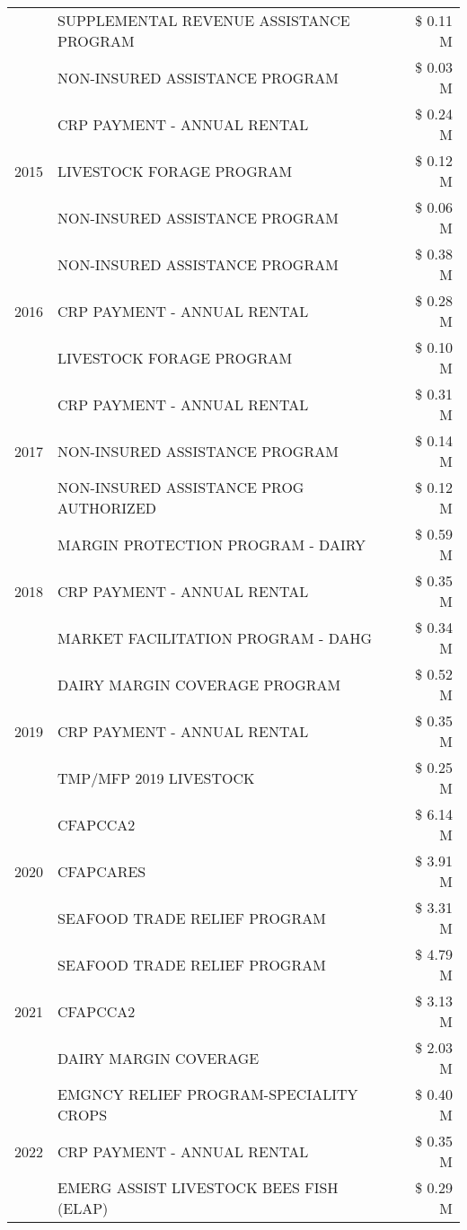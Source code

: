 \begin{tabular}{llr}
 & SUPPLEMENTAL REVENUE ASSISTANCE PROGRAM & \$ 0.11 M \\
 & NON-INSURED ASSISTANCE PROGRAM & \$ 0.03 M \\
\cline{1-3}
\multirow[t]{3}{*}{2015} & CRP PAYMENT - ANNUAL RENTAL & \$ 0.24 M \\
 & LIVESTOCK FORAGE PROGRAM & \$ 0.12 M \\
 & NON-INSURED ASSISTANCE PROGRAM & \$ 0.06 M \\
\cline{1-3}
\multirow[t]{3}{*}{2016} & NON-INSURED ASSISTANCE PROGRAM & \$ 0.38 M \\
 & CRP PAYMENT - ANNUAL RENTAL & \$ 0.28 M \\
 & LIVESTOCK FORAGE PROGRAM & \$ 0.10 M \\
\cline{1-3}
\multirow[t]{3}{*}{2017} & CRP PAYMENT - ANNUAL RENTAL & \$ 0.31 M \\
 & NON-INSURED ASSISTANCE PROGRAM & \$ 0.14 M \\
 & NON-INSURED ASSISTANCE PROG AUTHORIZED & \$ 0.12 M \\
\cline{1-3}
\multirow[t]{3}{*}{2018} & MARGIN PROTECTION PROGRAM - DAIRY & \$ 0.59 M \\
 & CRP PAYMENT - ANNUAL RENTAL & \$ 0.35 M \\
 & MARKET FACILITATION PROGRAM - DAHG & \$ 0.34 M \\
\cline{1-3}
\multirow[t]{3}{*}{2019} & DAIRY MARGIN COVERAGE PROGRAM & \$ 0.52 M \\
 & CRP PAYMENT - ANNUAL RENTAL & \$ 0.35 M \\
 & TMP/MFP 2019 LIVESTOCK & \$ 0.25 M \\
\cline{1-3}
\multirow[t]{3}{*}{2020} & CFAPCCA2 & \$ 6.14 M \\
 & CFAPCARES & \$ 3.91 M \\
 & SEAFOOD TRADE RELIEF PROGRAM & \$ 3.31 M \\
\cline{1-3}
\multirow[t]{3}{*}{2021} & SEAFOOD TRADE RELIEF PROGRAM & \$ 4.79 M \\
 & CFAPCCA2 & \$ 3.13 M \\
 & DAIRY MARGIN COVERAGE & \$ 2.03 M \\
\cline{1-3}
\multirow[t]{3}{*}{2022} & EMGNCY RELIEF PROGRAM-SPECIALITY CROPS & \$ 0.40 M \\
 & CRP PAYMENT - ANNUAL RENTAL & \$ 0.35 M \\
 & EMERG ASSIST LIVESTOCK BEES FISH (ELAP) & \$ 0.29 M \\
\cline{1-3}
\bottomrule
\end{tabular}
